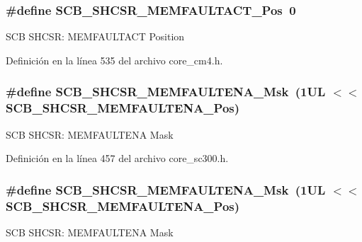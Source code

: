 \subsubsection[{\texorpdfstring{S\+C\+B\+\_\+\+S\+H\+C\+S\+R\+\_\+\+M\+E\+M\+F\+A\+U\+L\+T\+A\+C\+T\+\_\+\+Pos}{SCB_SHCSR_MEMFAULTACT_Pos}}]{\setlength{\rightskip}{0pt plus 5cm}\#define S\+C\+B\+\_\+\+S\+H\+C\+S\+R\+\_\+\+M\+E\+M\+F\+A\+U\+L\+T\+A\+C\+T\+\_\+\+Pos~0}\hypertarget{group___c_m_s_i_s___s_c_b_ga7c856f79a75dcc1d1517b19a67691803}{}\label{group___c_m_s_i_s___s_c_b_ga7c856f79a75dcc1d1517b19a67691803}
S\+CB S\+H\+C\+SR\+: M\+E\+M\+F\+A\+U\+L\+T\+A\+CT Position 

Definición en la línea 535 del archivo core\+\_\+cm4.\+h.

\subsubsection[{\texorpdfstring{S\+C\+B\+\_\+\+S\+H\+C\+S\+R\+\_\+\+M\+E\+M\+F\+A\+U\+L\+T\+E\+N\+A\+\_\+\+Msk}{SCB_SHCSR_MEMFAULTENA_Msk}}]{\setlength{\rightskip}{0pt plus 5cm}\#define S\+C\+B\+\_\+\+S\+H\+C\+S\+R\+\_\+\+M\+E\+M\+F\+A\+U\+L\+T\+E\+N\+A\+\_\+\+Msk~(1\+U\+L $<$$<$ S\+C\+B\+\_\+\+S\+H\+C\+S\+R\+\_\+\+M\+E\+M\+F\+A\+U\+L\+T\+E\+N\+A\+\_\+\+Pos)}\hypertarget{group___c_m_s_i_s___s_c_b_gaf084424fa1f69bea36a1c44899d83d17}{}\label{group___c_m_s_i_s___s_c_b_gaf084424fa1f69bea36a1c44899d83d17}
S\+CB S\+H\+C\+SR\+: M\+E\+M\+F\+A\+U\+L\+T\+E\+NA Mask 

Definición en la línea 457 del archivo core\+\_\+sc300.\+h.

\subsubsection[{\texorpdfstring{S\+C\+B\+\_\+\+S\+H\+C\+S\+R\+\_\+\+M\+E\+M\+F\+A\+U\+L\+T\+E\+N\+A\+\_\+\+Msk}{SCB_SHCSR_MEMFAULTENA_Msk}}]{\setlength{\rightskip}{0pt plus 5cm}\#define S\+C\+B\+\_\+\+S\+H\+C\+S\+R\+\_\+\+M\+E\+M\+F\+A\+U\+L\+T\+E\+N\+A\+\_\+\+Msk~(1\+U\+L $<$$<$ S\+C\+B\+\_\+\+S\+H\+C\+S\+R\+\_\+\+M\+E\+M\+F\+A\+U\+L\+T\+E\+N\+A\+\_\+\+Pos)}\hypertarget{group___c_m_s_i_s___s_c_b_gaf084424fa1f69bea36a1c44899d83d17}{}\label{group___c_m_s_i_s___s_c_b_gaf084424fa1f69bea36a1c44899d83d17}
S\+CB S\+H\+C\+SR\+: M\+E\+M\+F\+A\+U\+L\+T\+E\+NA Mask 

